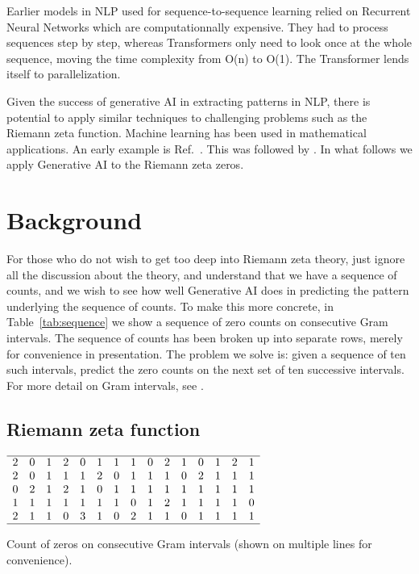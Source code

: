 \documentclass[journal]{IEEEtai}
\begin{document}
Earlier models in NLP used for sequence-to-sequence learning relied on Recurrent Neural Networks which are computationnally expensive. They had to process sequences step by step, whereas Transformers only need to look once at the whole sequence, moving the time complexity from O(n) to O(1). The Transformer lends itself to parallelization. 

Given the success of generative AI in extracting patterns in NLP, there is potential to apply similar techniques to challenging problems such as the Riemann zeta function.
Machine learning has been used in mathematical applications. An early example is  Ref.~\cite{osneural}. This was followed by \cite{he2022sato,HeMLNF,HeStringLandscape,
Vartziotis2023,Kim2022}. In what follows we apply Generative AI to the Riemann zeta zeros.

\section{Background}

For those who do not wish to get too deep into Riemann zeta theory, just ignore all the discussion about the theory, and understand that we have a sequence of counts, and we wish to see how well Generative AI does in predicting the pattern underlying the sequence of counts. To make this more concrete, in Table~\ref{tab:sequence} we show a sequence of zero counts on consecutive Gram intervals. The sequence of counts has been broken up into separate rows, merely for convenience in presentation. The problem we solve is: given a sequence of ten such intervals, predict the zero counts on the next set of ten successive intervals.
For more detail on Gram intervals, see \cite{Shanker 2018a}.

\subsection{Riemann zeta function}


\begin{table}
\centering \(\begin{array}{ccccccccccccccc}
\hline
2& 0& 1& 2& 0& 1& 1& 1& 0& 2& 1& 0& 1& 2& 1 \\
2& 0& 1& 1& 1& 2& 0& 1& 1& 1& 0& 2& 1& 1& 1 \\
0& 2& 1& 2& 1& 0& 1& 1& 1& 1& 1& 1& 1& 1& 1 \\
1& 1& 1& 1& 1& 1& 1& 0& 1& 2& 1& 1& 1& 1& 0 \\
2& 1& 1& 0& 3& 1& 0& 2& 1& 1& 0& 1& 1& 1& 1 \\
\hline
\end{array}\)
\caption{Count of zeros on consecutive Gram intervals (shown on multiple lines for convenience).} 
\label{tab:sequence}
\end{table}
\end{document}
